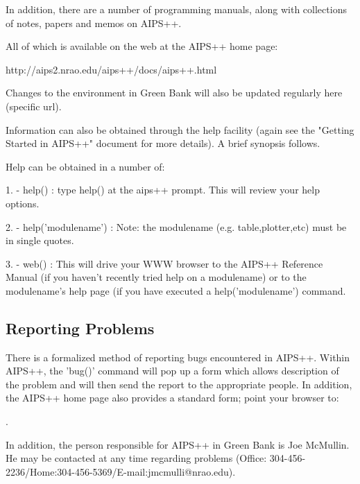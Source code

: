 In addition, there are a number of programming manuals, along with
collections of notes, papers and memos on AIPS++.
 
All of which is available on the web at the AIPS++ home page:
 
http://aips2.nrao.edu/aips++/docs/aips++.html

Changes to the environment in Green Bank will also be updated regularly
here (specific url).
 
Information can also be obtained through the help facility (again see the
"Getting Started in AIPS++" document for more details). A brief synopsis
follows.

Help can be obtained in a number of:
\begin{description}
\item{1.} - help() : type help() at the aips++ prompt. This will review your
	help options. 
\item{2.} - help('modulename') : Note: the modulename (e.g. table,plotter,etc)
		must be in single quotes.
\item{3.} - web() : This will drive your WWW browser to the AIPS++ Reference
	Manual (if you haven't recently tried help on a modulename) or to
	the modulename's help page (if you have executed a help('modulename')
	command.
\end{description}

\subsection{Reporting Problems}

There is a formalized method of reporting bugs encountered in AIPS++. 
Within AIPS++, the 'bug()' command will pop up a form which allows
description of the problem and will then send the report to the appropriate
people. In addition, the AIPS++ home page also provides a standard form;
point your browser to:

\begin{description}
\item{}.
\end{description}

In addition, the person responsible for AIPS++ in Green Bank is Joe McMullin.
He may be contacted at any time regarding problems (Office: 
304-456-2236/Home:304-456-5369/E-mail:jmcmulli@nrao.edu).


